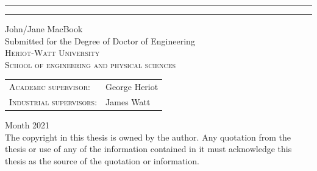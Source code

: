 \begin{titlepage}
	\vspace{0.5\baselineskip} %

	\rule{\textwidth}{0.4pt}\vspace*{-\baselineskip}\vspace*{3.2pt} %
	\rule{\textwidth}{1.6pt} %

	\vspace{1\baselineskip} %

{\LARGE John/Jane MacBook}\\%
\vspace{1\baselineskip}
{\large Submitted for the Degree of Doctor of Engineering\\}
\vspace{1\baselineskip}
{\scshape \large Heriot-Watt University} \\ {\scshape School of engineering and physical sciences}

	\vspace*{2\baselineskip} %


{\Large \linespread{1.2}
\begin{tabular}{ll}
	{\scshape Academic supervisor}:  & George Heriot \\
	{\scshape Industrial supervisors}: &  James Watt
\end{tabular}
}

\vfill
{\Large Month 2021\\}
\vspace*{\baselineskip}
{\footnotesize \linespread{1} The copyright in this thesis is owned by the author. Any quotation from the thesis or use of any of the information contained in it must acknowledge this thesis as the source of the quotation or information.}


\end{titlepage}
\restoregeometry
